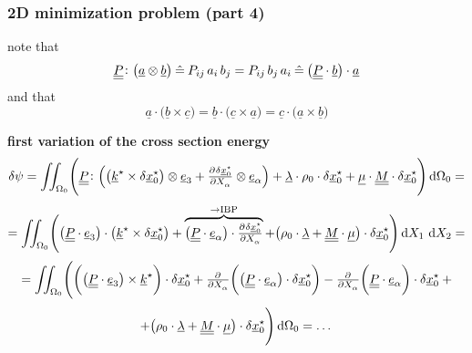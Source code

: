 \begin{frame}
  \frametitle{2D minimization problem (part 4)}

  note that
  \begin{displaymath}
    \underline{\underline{P}} \colon \bigl( \underline{a} \otimes \underline{b} \bigr) \: \hat{=} \: P_{ij} \, a_i \, b_j = P_{ij} \, b_j \, a_i \: \hat{=} \: \bigl( \underline{\underline{P}} \cdot \underline{b} \bigr) \cdot \underline{a}
  \end{displaymath}
  and that
  \begin{displaymath}
    \underline{a} \cdot \bigl( \underline{b} \times \underline{c} \bigr) =
    \underline{b} \cdot \bigl( \underline{c} \times \underline{a} \bigr) =
    \underline{c} \cdot \bigl( \underline{a} \times \underline{b} \bigr)
  \end{displaymath}

  \vspace{1em}
  \textbf{first variation of the cross section energy}
  \begin{displaymath}
    \delta \psi = 
    \iint_{\Omega_0} \Biggl(
      \doubleunderline{P} \colon \Bigl(
        \bigl( \underline{k}^{\star} \times \delta \underline{x}_0^{\star} \bigr) \otimes \underline{e}_3 +
        \pd{\delta \underline{x}_0^{\star}}{X_{\alpha}} \otimes \underline{e}_{\alpha}
      \Bigr) +
      \underline{\lambda} \cdot \rho_0 \cdot \delta \underline{x}_0^{\star} +
      \underline{\mu} \cdot \doubleunderline{M} \cdot \delta \underline{x}_0^{\star}
    \Biggr) \dif \Omega_0 = 
  \end{displaymath}
  \begin{displaymath}
    = \iint_{\Omega_0} \Biggl(
      \bigl( \doubleunderline{P} \cdot \underline{e}_3 \bigr) \cdot \bigl( \underline{k}^{\star} \times \delta \underline{x}_0^{\star} \bigr) +
      \overbrace{
      \bigl( \doubleunderline{P} \cdot \underline{e}_{\alpha} \bigr) \cdot \pd{\delta \underline{x}_0^{\star}}{X_{\alpha}} }^{\rightarrow \text{IBP}} +
      \bigl(
        \rho_0 \cdot \underline{\lambda} +
        \doubleunderline{M} \cdot \underline{\mu}
      \bigr) \cdot \delta \underline{x}_0^{\star}
    \Biggr) \dif X_1 \, \dif X_2 =
  \end{displaymath}
  \begin{displaymath}
    = \iint_{\Omega_0} \Biggl(
      \biggl( \bigl( \doubleunderline{P} \cdot \underline{e}_3 \bigr) \times \underline{k}^{\star} \biggr) \cdot \delta \underline{x}_0^{\star} +
      \pd{}{X_{\alpha}} \biggl( \bigl( \doubleunderline{P} \cdot \underline{e}_{\alpha} \bigr) \cdot \delta \underline{x}_0^{\star} \biggr) -
      \pd{}{X_{\alpha}} \biggl( \doubleunderline{P} \cdot \underline{e}_{\alpha} \biggr) \cdot \delta \underline{x}_0^{\star} \: +
  \end{displaymath}
  \begin{displaymath}
      + \bigl(
        \rho_0 \cdot \underline{\lambda} +
        \doubleunderline{M} \cdot \underline{\mu}
      \bigr) \cdot \delta \underline{x}_0^{\star}
    \Biggr) \dif \Omega_0 = \dots
  \end{displaymath}
  
\end{frame}


